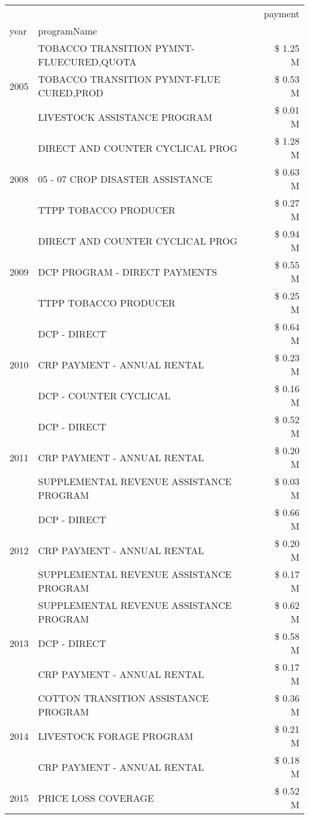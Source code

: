 \begin{tabular}{llr}
\toprule
 &  & payment \\
year & programName &  \\
\midrule
\multirow[t]{3}{*}{2005} & TOBACCO TRANSITION PYMNT-FLUECURED,QUOTA & \$ 1.25 M \\
 & TOBACCO TRANSITION PYMNT-FLUE CURED,PROD & \$ 0.53 M \\
 & LIVESTOCK ASSISTANCE PROGRAM & \$ 0.01 M \\
\cline{1-3}
\multirow[t]{3}{*}{2008} & DIRECT AND COUNTER CYCLICAL PROG & \$ 1.28 M \\
 & 05 - 07 CROP DISASTER ASSISTANCE & \$ 0.63 M \\
 & TTPP TOBACCO PRODUCER & \$ 0.27 M \\
\cline{1-3}
\multirow[t]{3}{*}{2009} & DIRECT AND COUNTER CYCLICAL PROG & \$ 0.94 M \\
 & DCP PROGRAM - DIRECT PAYMENTS & \$ 0.55 M \\
 & TTPP TOBACCO PRODUCER & \$ 0.25 M \\
\cline{1-3}
\multirow[t]{3}{*}{2010} & DCP - DIRECT & \$ 0.64 M \\
 & CRP PAYMENT - ANNUAL RENTAL & \$ 0.23 M \\
 & DCP - COUNTER CYCLICAL & \$ 0.16 M \\
\cline{1-3}
\multirow[t]{3}{*}{2011} & DCP - DIRECT & \$ 0.52 M \\
 & CRP PAYMENT - ANNUAL RENTAL & \$ 0.20 M \\
 & SUPPLEMENTAL REVENUE ASSISTANCE PROGRAM & \$ 0.03 M \\
\cline{1-3}
\multirow[t]{3}{*}{2012} & DCP - DIRECT & \$ 0.66 M \\
 & CRP PAYMENT - ANNUAL RENTAL & \$ 0.20 M \\
 & SUPPLEMENTAL REVENUE ASSISTANCE PROGRAM & \$ 0.17 M \\
\cline{1-3}
\multirow[t]{3}{*}{2013} & SUPPLEMENTAL REVENUE ASSISTANCE PROGRAM & \$ 0.62 M \\
 & DCP - DIRECT & \$ 0.58 M \\
 & CRP PAYMENT - ANNUAL RENTAL & \$ 0.17 M \\
\cline{1-3}
\multirow[t]{3}{*}{2014} & COTTON TRANSITION ASSISTANCE PROGRAM & \$ 0.36 M \\
 & LIVESTOCK FORAGE PROGRAM & \$ 0.21 M \\
 & CRP PAYMENT - ANNUAL RENTAL & \$ 0.18 M \\
\cline{1-3}
\multirow[t]{3}{*}{2015} & PRICE LOSS COVERAGE & \$ 0.52 M \\

\end{tabular}
